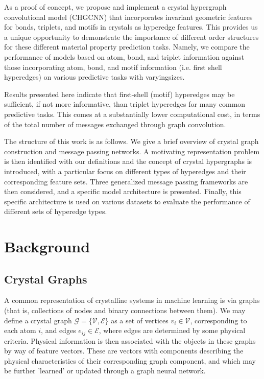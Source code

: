 \documentclass[twoside,twocolumn,9pt]{article}
\begin{document}
As a proof of concept, we propose and implement a crystal hypergraph convolutional model (CHGCNN) that incorporates invariant geometric features for bonds, triplets, and motifs in crystals as hyperedge features. This provides us a unique opportunity to demonstrate the importance of different order structures for these different material property prediction tasks. Namely, we compare the performance of models based on atom, bond, and triplet information against those incorporating atom, bond, and motif information (i.e. first shell hyperedges) on various predictive tasks with varyingsizes.

Results presented here indicate that first-shell (motif) hyperedges may be sufficient, if not more informative, than triplet hyperedges for many common predictive tasks. This comes at a substantially lower computational cost, in terms of the total number of messages exchanged through graph convolution.

The structure of this work is as follows. We give a brief overview of crystal graph construction and message passing networks. A motivating representation problem is then identified with our definitions and the concept of crystal hypergraphs is introduced, with a particular focus on different types of hyperedges and their corresponding feature sets. Three generalized message passing frameworks are then considered, and a specific model architecture is presented. Finally, this specific architecture is used on various datasets to evaluate the performance of different sets of hyperedge types.

\section{Background}
\subsection{Crystal Graphs}
A common representation of crystalline systems in machine learning is via graphs (that is, collections of nodes and binary connections between them). We may define a crystal graph $\mathcal{G}=\lbrace \mathcal{V},\mathcal{E}\rbrace$ as a set of vertices $v_i\in\mathcal{V}$, corresponding to each atom $i$, and edges $e_{ij}\in\mathcal{E}$, where edges are determined by some physical criteria. Physical information is then associated with the objects in these graphs by way of feature vectors. These are vectors with components describing the physical characteristics of their corresponding graph component, and which may be further 'learned' or updated through a graph neural network.
\end{document}
